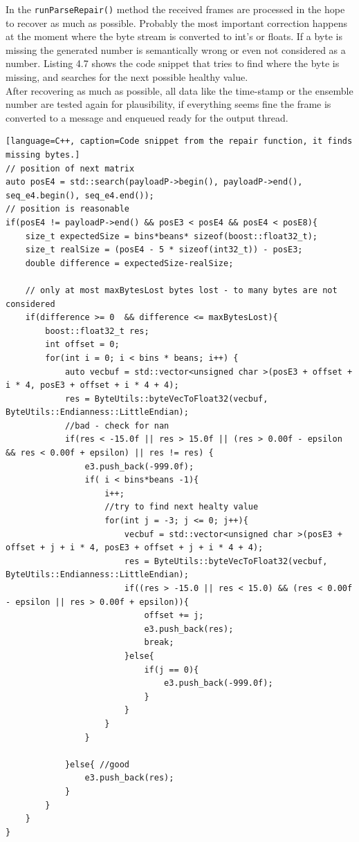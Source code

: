In the \texttt{runParseRepair()} method the received frames are processed in the hope to recover as much as possible. Probably the most important correction happens at the moment where the byte stream is converted to int's or floats. If a byte is missing the generated number is semantically wrong or even not considered as a number. Listing 4.7 shows the code snippet that tries to find where the byte is missing, and searches for the next possible healthy value.\\
After recovering as much as possible, all data like the time-stamp or the ensemble number are tested again for plausibility, if everything seems fine the frame is converted to a message and enqueued ready for the output thread.
\begin{lstlisting}[language=C++, caption=Code snippet from the repair function, it finds missing bytes.]
// position of next matrix
auto posE4 = std::search(payloadP->begin(), payloadP->end(), seq_e4.begin(), seq_e4.end());
// position is reasonable
if(posE4 != payloadP->end() && posE3 < posE4 && posE4 < posE8){
    size_t expectedSize = bins*beans* sizeof(boost::float32_t);
    size_t realSize = (posE4 - 5 * sizeof(int32_t)) - posE3;
    double difference = expectedSize-realSize;

    // only at most maxBytesLost bytes lost - to many bytes are not considered
    if(difference >= 0  && difference <= maxBytesLost){
        boost::float32_t res;
        int offset = 0;
        for(int i = 0; i < bins * beans; i++) {
            auto vecbuf = std::vector<unsigned char >(posE3 + offset + i * 4, posE3 + offset + i * 4 + 4);
            res = ByteUtils::byteVecToFloat32(vecbuf, ByteUtils::Endianness::LittleEndian);
            //bad - check for nan
            if(res < -15.0f || res > 15.0f || (res > 0.00f - epsilon && res < 0.00f + epsilon) || res != res) {
                e3.push_back(-999.0f);
                if( i < bins*beans -1){
                    i++;
                    //try to find next healty value
                    for(int j = -3; j <= 0; j++){
                        vecbuf = std::vector<unsigned char >(posE3 + offset + j + i * 4, posE3 + offset + j + i * 4 + 4);
                        res = ByteUtils::byteVecToFloat32(vecbuf, ByteUtils::Endianness::LittleEndian);
                        if((res > -15.0 || res < 15.0) && (res < 0.00f - epsilon || res > 0.00f + epsilon)){
                            offset += j;
                            e3.push_back(res);
                            break;
                        }else{
                            if(j == 0){
                                e3.push_back(-999.0f);
                            }
                        }
                    }
                }

            }else{ //good
                e3.push_back(res);
            }
        }
    }
}
\end{lstlisting}

